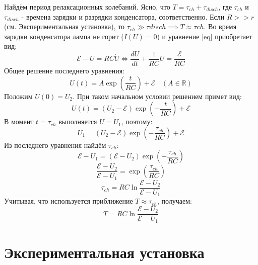 \documentclass[14pt, a4paper,reqno]{article}
\begin{document}
    Найдём период релаксационных колебаний. Ясно, что $T = \tau_{ch} + \tau_{disch}$, где $\tau_{ch}$
    и $\tau_{disch}$ - времена зарядки и разрядки конденсатора, соответственно. Если $R >> r$ (см. 
    Экспериментальная установка), то $\tau_{ch} \gg \tau{disch} \implies T \approx \tau{ch}$. Во время
    зарядки конденсатора лампа не горит ($I(U) = 0$) и уравнение \eqref{eq} приобретает вид:
    \begin{equation*}
        \mathcal{E} - U = RC\dot{U} \iff \frac{dU}{dt} + \frac{1}{RC}U = \frac{\mathcal{E}}{RC}
    \end{equation*}
    Общее решение последнего уравнения:
    \begin{equation*}
        U(t) = A \exp\left(\frac{t}{RC}\right) + \mathcal{E}\ \ \ \ (A \in \mathbb{R})
    \end{equation*}
    Положим $U(0) = U_2$. При таком начальном условии решением примет вид:
    \begin{equation*}
        U(t) = (U_2 - \mathcal{E}) \exp\left(-\frac{t}{RC}\right) + \mathcal{E}
    \end{equation*}
    В момент $t = \tau_{ch}$ выполняется $U = U_1$, поэтому:
    \begin{equation*}
        U_1 = (U_2 - \mathcal{E}) \exp\left(-\frac{\tau_{ch}}{RC}\right) + \mathcal{E}
    \end{equation*}
    Из последнего уравнения найдём $\tau_{ch}$:
    \begin{equation*}
        \mathcal{E} - U_1 = (\mathcal{E} - U_2) \exp\left(-\frac{\tau_{ch}}{RC}\right)
    \end{equation*}
    \begin{equation*}
        \frac{\mathcal{E} - U_2}{\mathcal{E} - U_1} = \exp\left(\frac{\tau_{ch}}{RC}\right)
    \end{equation*}
    \begin{equation*}
        \tau_{ch} = RC \ln{\frac{\mathcal{E} - U_2}{\mathcal{E} - U_1}}
    \end{equation*}
    Учитывая, что используется приближение $T \approx \tau_{ch}$, получаем:
    \begin{equation}\label{period}
        \boxed{T = RC \ln{\frac{\mathcal{E} - U_2}{\mathcal{E} - U_1}}}
    \end{equation}

\section{Экспериментальная установка}
\end{document}
